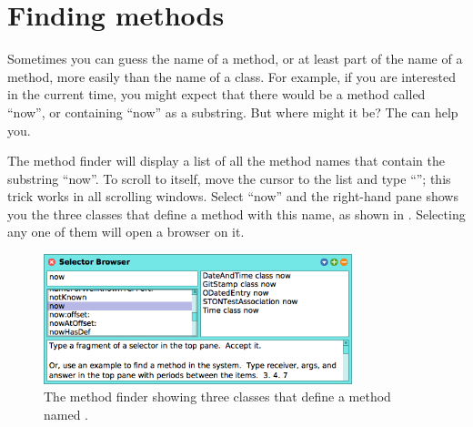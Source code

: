 \documentclass[a4paper,10pt,twoside]{book}
\begin{document}
\section{Finding methods}
\label{sec:quick:methodFinder}

Sometimes you can guess the name of a method, or at least part of the name of a method, more easily than the name of a class.  For example, if you are interested in the current time, you might expect that there would be a method called ``now'', or containing ``now'' as a substring.   But where might it be?
The  can help you.

The method finder will display a list of all the method names that contain the substring ``now''.  
To scroll to  itself, move the cursor to the list and type ``''; this trick works in all scrolling windows.  Select ``now'' and the right-hand pane shows you the three classes that define a method with this name, as shown in .  Selecting any one of them will open a browser on it.


\begin{figure}[hbt]
\centerline {\includegraphics[width=0.8\textwidth]{methodFinder-now}}
\caption{The method finder showing three classes that define a method named .
\label{fig:MethodFinder}}
\end{figure}
\end{document}
